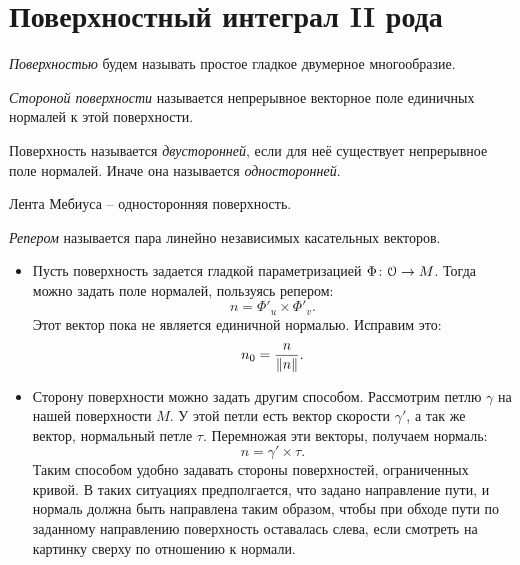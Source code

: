 \section{Поверхностный интеграл II рода}

\begin{definition}
    \textit{Поверхностью} будем называть простое гладкое двумерное многообразие.
\end{definition}

\begin{definition}
    \textit{Стороной поверхности} называется непрерывное векторное поле единичных нормалей
    к этой поверхности.
\end{definition}

\begin{definition}
    Поверхность называется \textit{двусторонней}, если для неё существует непрерывное
    поле нормалей. Иначе она называется \textit{односторонней}.
\end{definition}

\begin{example}
    Лента Мебиуса -- односторонняя поверхность.
\end{example}

\begin{definition}
    \textit{Репером} называется пара линейно независимых касательных векторов.
\end{definition}

\begin{example}
    \enewline
    \begin{itemize}
        \item Пусть поверхность задается гладкой параметризацией $\Phi \colon \mathcal{O} \to M$.
            Тогда можно задать поле нормалей, пользуясь репером:
            \[
                n = \Phi'_u \times \Phi'_v
            .\]
            Этот вектор пока не является единичной нормалью. Исправим это:
            \[
                n_0 = \frac{n}{\left\lVert n\right\rVert}
            .\]
        \item Сторону поверхности можно задать другим способом. Рассмотрим петлю $\gamma$
            на нашей поверхности $M$. У этой петли есть вектор скорости $\gamma'$, а так
            же вектор, нормальный петле $\tau$. Перемножая эти векторы, получаем нормаль:
            \[
                n = \gamma' \times \tau
            .\]
            Таким способом удобно задавать стороны поверхностей, ограниченных кривой.
            В таких ситуациях предполгается, что задано направление пути, и нормаль должна быть
            направлена таким образом, чтобы при обходе пути по заданному направлению 
            поверхность оставалась слева, если смотреть на картинку сверху по отношению
            к нормали.
    \end{itemize}       
\end{example}

